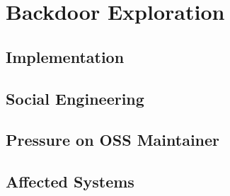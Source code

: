 \section{Backdoor Exploration}

\subsection{Implementation}
\subsection{Social Engineering}
\subsection{Pressure on OSS Maintainer}
\subsection{Affected Systems}

